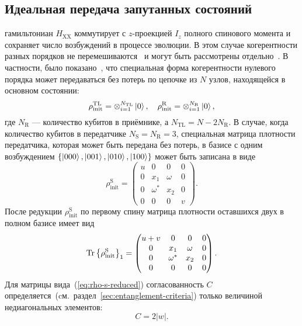 \subsection{Идеальная передача запутанных состояний}

гамильтониан $H_\mathrm{XX}$ коммутирует с $z$-проекцией $I_z$ полного спинового момента
и сохраняет число возбуждений в процессе эволюции.
В этом случае когерентности разных порядков не перемешиваются~\cite{Feldman2017} и могут быть рассмотрены отдельно~\cite{Bochkin2018qip}.
В частности, было показано~\cite{Feldman2021},
что специальная форма когерентности нулевого порядка может передаваться без потерь
по цепочке из $N$ узлов, находящейся в основном состоянии:
%
\begin{equation}
  \rho^\mathrm{TL}_\mathrm{init} = \otimes^{N_\mathrm{TL}}_{i=1}\left| 0 \right\rangle,
  \quad
  \rho^\mathrm{R}_\mathrm{init} = \otimes^{N_\mathrm{R}}_{i=1}\left| 0 \right\rangle,
\end{equation}
%
где $N_\mathrm{R}$ --- количество кубитов в приёмнике,
а $N_\mathrm{TL}  = N - 2 N_\mathrm{R}$.
В случае, когда количество кубитов в передатчике $N_\mathrm{S} = N_\mathrm{R} = 3$,
специальная матрица плотности передатчика,
которая может быть передана без потерь,
в базисе с одним возбуждением
$\left \{\left| 000 \right\rangle, \left| 001 \right\rangle, \left| 010 \right\rangle, \left| 100 \right\rangle \right\}$
может быть записана в виде
%
\begin{equation}
  \rho^\mathrm{S}_\mathrm{init} =
  \begin{pmatrix}
    u &    0     &    0    & 0 \\
    0 &   x_1    & \omega  & 0 \\
    0 & \omega^* &   x_2   & 0 \\
    0 &    0     &    0    & v
  \end{pmatrix}.
\end{equation}
%
После редукции $\rho^\mathrm{S}_\mathrm{init}$ по первому спину
матрица плотности оставшихся двух в полном базисе имеет вид
\begin{equation}\label{eq:rho-s-reduced}
  \mathrm{Tr} \left\{ \rho^\mathrm{S}_\mathrm{init} \right\}_{1} =
  \begin{pmatrix}
    u + v &    0     &    0    & 0 \\
    0     &   x_1    & \omega  & 0 \\
    0     & \omega^* &   x_2   & 0 \\
    0     &    0     &    0    & 0
  \end{pmatrix}.
\end{equation}
Для матрицы вида~(\ref{eq:rho-s-reduced}) согласованность $C$
определяется~(cм.~раздел~\ref{sec:entanglement-criteria}) только величиной недиагональных элементов:
%
\begin{equation}
  C = 2 |w|.
\end{equation}


